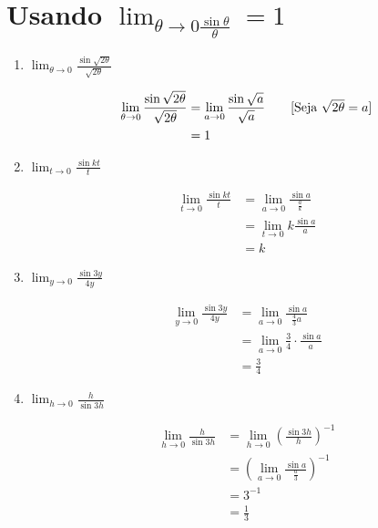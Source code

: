 \documentclass[a4paper, 12pt]{article}
\begin{document}
\section*{Usando $\lim_{\theta \to 0 \frac{\sin \theta}{\theta}} = 1$}
\begin{enumerate}\addtocounter{enumi}{20}
    \item $\lim_{\theta \to 0} \frac{\sin\sqrt{2\theta}}{\sqrt{2\theta}}$
    
    \begin{align*}
        \lim_{\theta \to 0} \frac{\sin\sqrt{2\theta}}{\sqrt{2\theta}} &= \lim_{a \to 0} \frac{\sin\sqrt{a}}{\sqrt{a}} \tag*{[Seja $\sqrt{2 \theta} = a$]}\\
        &= 1 \\
    \end{align*}

    \item $\lim_{t \to 0} \frac{\sin kt}{t}$
    
    \begin{align*}
        \lim_{t \to 0} \frac{\sin kt}{t} &= \lim_{a \to 0} \frac{\sin a}{\frac{a}{k}} \tag*{[Seja $kt = a$]}\\
        &= \lim_{t \to 0} k \frac{\sin a}{a} \\
        &= k
    \end{align*}

    \item $\lim_{y \to 0} \frac{\sin 3y}{4y}$
    
    \begin{align*}
        \lim_{y \to 0} \frac{\sin 3y}{4y} &= \lim_{a \to 0} \frac{\sin a}{\frac{4}{3}a} \tag*{[seja 3y = a]}\\
        &=\lim_{a \to 0} \frac{3}{4} \cdot \frac{\sin a}{a}\\
        &= \frac{3}{4}
    \end{align*}

    \item $\lim_{h \to 0} \frac{h}{\sin 3h}$
    
    \begin{align*}
        \lim_{h \to 0} \frac{h}{\sin 3h} &= \lim_{h \to 0} \left(\frac{\sin 3h}{h}\right)^{-1}\\
        &=\left(\lim_{a \to 0} \frac{\sin a}{\frac{a}{3}}\right)^{-1} \tag*{[Seja 3h = a]}\\
        &= 3^{-1}\\
        &= \frac{1}{3}
    \end{align*}


\end{enumerate}
\end{document}
